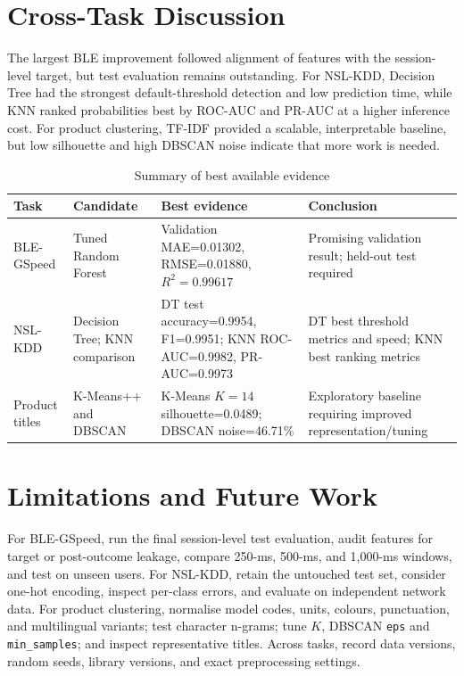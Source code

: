 \documentclass[conference]{IEEEtran}
\begin{document}
\section{Cross-Task Discussion}
The largest BLE improvement followed alignment of features with the session-level target, but test evaluation remains outstanding. For NSL-KDD, Decision Tree had the strongest default-threshold detection and low prediction time, while KNN ranked probabilities best by ROC-AUC and PR-AUC at a higher inference cost. For product clustering, TF-IDF provided a scalable, interpretable baseline, but low silhouette and high DBSCAN noise indicate that more work is needed.
\begin{table}[t]
\caption{Summary of best available evidence}
\centering\small
\begin{tabular}{p{}p{}p{}p{}}
\toprule Task & Candidate & Best evidence & Conclusion\\\midrule
BLE-GSpeed & Tuned Random Forest & Validation MAE=0.01302, RMSE=0.01880, $R^2=0.99617$ & Promising validation result; held-out test required\\
NSL-KDD & Decision Tree; KNN comparison & DT test accuracy=0.9954, F1=0.9951; KNN ROC-AUC=0.9982, PR-AUC=0.9973 & DT best threshold metrics and speed; KNN best ranking metrics\\
Product titles & K-Means++ and DBSCAN & K-Means $K=14$ silhouette=0.0489; DBSCAN noise=46.71\% & Exploratory baseline requiring improved representation/tuning\\
\bottomrule
\end{tabular}
\end{table}

\section{Limitations and Future Work}
For BLE-GSpeed, run the final session-level test evaluation, audit features for target or post-outcome leakage, compare 250-ms, 500-ms, and 1,000-ms windows, and test on unseen users. For NSL-KDD, retain the untouched test set, consider one-hot encoding, inspect per-class errors, and evaluate on independent network data. For product clustering, normalise model codes, units, colours, punctuation, and multilingual variants; test character n-grams; tune $K$, DBSCAN \texttt{eps} and \texttt{min\_samples}; and inspect representative titles. Across tasks, record data versions, random seeds, library versions, and exact preprocessing settings.
\end{document}
